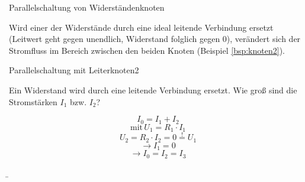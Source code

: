 \begin{frame}
{\begin{bsp}{Parallelschaltung von Widerständen}{knoten}
		\end{bsp}

		Wird einer der Widerstände durch eine ideal leitende Verbindung ersetzt (Leitwert geht gegen
		unendlich, Widerstand folglich gegen 0), verändert sich der Stromfluss im Bereich
		zwischen den beiden Knoten (Beispiel \ref{bsp:knoten2}).



		\begin{bsp}{Parallelschaltung mit Leiter}{knoten2}

			Ein Widerstand wird durch eine leitende Verbindung ersetzt.
			Wie groß sind die Stromstärken  $I_1$ bzw. $I_2$?\\

			\begin{center}

			\end{center}

			\begin{equation*}
				I_0=I_1+I_2
			\end{equation*}
			\begin{equation*}
				\mathrm{mit} \, U_1 = R_1 \cdot I_1
			\end{equation*}
			\begin{equation*}
				U_2 = R_2 \cdot I_2 =0 \stackrel{!}{=} U_1
			\end{equation*}
			\begin{equation*}
				\rightarrow I_1 = 0
			\end{equation*}
			\begin{equation*}
				\rightarrow I_0 = I_2 = I_3
			\end{equation*}






		\end{bsp}
	}
	\b{

		\begin{columns}





\end{columns}}
\end{frame}
